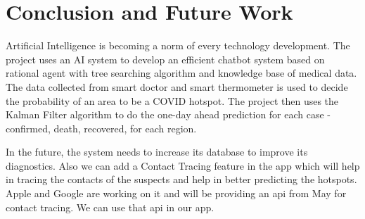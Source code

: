 \documentclass[10pt,twocolumn,letterpaper]{article}
\begin{document}
\section{Conclusion and Future Work}

Artificial Intelligence is becoming a norm of every technology development. The project uses an AI system to develop an efficient chatbot system based on rational agent with tree searching algorithm and knowledge base of medical data. The data collected from smart doctor and smart thermometer is used to decide the probability of an area to be a COVID hotspot. The project then uses the Kalman Filter algorithm to do the one-day ahead prediction for each case - confirmed, death, recovered, for each region.


In the future, the system needs to increase its database to improve its diagnostics. Also we can add a Contact Tracing feature in the app which will help in tracing the contacts of the suspects and help in better predicting the hotspots. Apple and Google are working on it and will be providing an api from May for contact tracing. We can use that api in our app.~\cite{contact-tracing}


{\small


}
\end{document}
